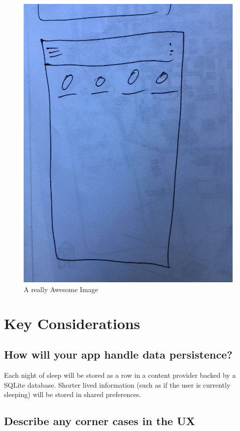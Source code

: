 \documentclass[twoside, letterpaper, american]{article}
\begin{document}
\begin{figure}[!htb]
  \includegraphics[width=\linewidth]{images/trophy.JPG}
  \caption{A really Awesome Image}\label{fig:trophy}
\endminipage
\end{figure}


\section*{Key Considerations}
\subsection*{How will your app handle data persistence?}

Each night of sleep will be stored as a row in a content provider backed by a SQLite database. Shorter lived information (such as if the user is currently sleeping) will be stored in shared preferences.

\subsection*{Describe any corner cases in the UX}
\end{document}
